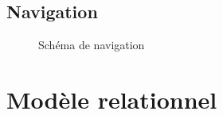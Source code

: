 \documentclass[letterpaper,10pt,oneside]{sphinxmanual}
\begin{document}
\section{Navigation}
\label{schemas:navigation}\begin{figure}[htbp]
\centering
\capstart

\caption{Schéma de navigation}\end{figure}


\chapter{Modèle relationnel}
\label{models:modele-relationnel}\label{models::doc}
\end{document}
